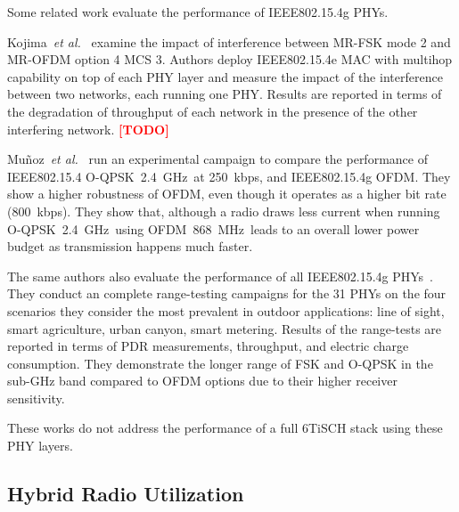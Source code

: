 \documentclass[sensors,article,submit,moreauthors,pdftex]{Definitions/mdpi}
\newcommand{\oqpsk}         {O-QPSK~2.4~GHz}
\newcommand{\ofdm}          {OFDM~868~MHz}
\newcommand{\etal}          {\textit{et al.}}
\newcommand{\todo}[1]       {\textbf{\textcolor{red}{[TODO] #1}}}
\begin{document}
Some related work evaluate the performance of IEEE802.15.4g PHYs.

Kojima~\etal~\cite{kojima15system} examine the impact of interference between MR-FSK mode 2 and MR-OFDM option 4 MCS 3. 
Authors deploy IEEE802.15.4e MAC with multihop capability on top of each PHY layer and measure the impact of the interference between two networks, each running one PHY.
Results are reported in terms of the degradation of throughput of each network in the presence of the other interfering network.
\todo{}

Mu\~noz~\etal~\cite{munoz18overview} run an experimental campaign to compare the performance of
    IEEE802.15.4 \oqpsk\ at 250~kbps, and
    IEEE802.15.4g OFDM.
They show a higher robustness of OFDM, even though it operates as a higher bit rate (800~kbps).
They show that, although a radio draws less current when running \oqpsk\, using \ofdm\ leads to an overall lower power budget as transmission happens much faster.

The same authors also evaluate the performance of all IEEE802.15.4g PHYs~\cite{munoz18evaluation}.
They conduct an complete range-testing campaigns for the 31 PHYs on the four scenarios they consider the most prevalent in outdoor applications:
    line of sight,
    smart agriculture,
    urban canyon,
    smart metering. 
Results of the range-tests are reported in terms of PDR measurements, throughput, and electric charge consumption.
They demonstrate the longer range of FSK and O-QPSK in the sub-GHz band compared to OFDM options due to their higher receiver sensitivity.  


These works do not address the performance of a full 6TiSCH stack using these PHY layers.  

\subsection{Hybrid Radio Utilization}
\label{sec:related_hybrid}
\end{document}
